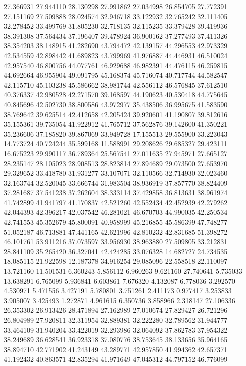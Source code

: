 27.366931
27.944110
28.130298
27.991862
27.034998
26.854705
27.772391
27.151169
27.509888
28.024574
32.946718
33.122932
32.765242
32.111405
32.278452
33.499769
31.805230
32.718135
32.115235
33.379428
39.419936
38.391308
37.564434
37.196407
39.478924
36.900162
37.277493
37.411326
38.354203
38.148915
41.282690
43.794472
42.139157
44.296553
42.973329
42.534559
42.898442
41.689823
43.799969
41.976887
44.446931
46.510024
42.957540
46.800756
44.077761
46.929688
46.982391
44.476115
46.259815
44.692664
46.955904
49.091795
45.168374
45.716074
40.717744
44.582547
42.115710
45.103238
45.586662
38.981744
42.556112
46.576845
37.612510
40.376337
42.980528
42.271570
39.168597
44.190623
40.530418
44.775645
40.845696
42.502730
38.800586
43.972977
35.438506
36.995675
41.583590
38.769642
39.625514
42.412658
42.205424
39.920601
41.190807
39.812616
35.155361
39.735054
41.922912
41.765712
37.562876
39.142600
41.350221
35.236606
37.185820
39.867069
33.949728
17.155513
29.555900
33.223043
14.773724
40.724244
35.599168
11.588991
29.208626
29.685327
29.423111
16.675223
29.990117
36.789364
25.567541
27.011635
27.945971
27.665127
28.235147
28.105023
28.908513
28.823814
27.894689
29.073500
27.653970
29.329652
33.418780
31.931277
33.107071
32.110566
32.714930
32.023460
32.163744
32.520045
33.666744
31.983504
38.936919
37.857770
38.824409
37.281687
37.541238
37.262604
38.333114
37.429858
36.813631
38.961974
41.742899
41.941797
41.170837
42.521260
42.552434
42.452939
42.279262
42.044393
42.396217
42.037542
46.281021
46.670703
44.990035
42.250534
42.741553
45.352679
45.800091
40.958999
45.216855
45.586399
47.748277
51.052187
46.713881
47.441165
42.621996
42.810232
42.831685
51.398272
46.101761
53.911216
37.073597
33.956930
38.963880
27.509805
33.212831
28.841109
35.265420
36.327041
42.424285
33.076328
14.682727
24.734535
18.085115
21.922598
12.187378
34.916254
29.085096
22.558518
22.110097
13.721160
11.501531
6.360243
5.856112
6.960263
9.621160
27.740641
5.735033
13.638291
6.765099
5.936841
6.603861
7.676320
4.132087
6.778036
3.292570
4.530971
5.471556
3.427191
5.780801
3.751261
2.411173
0.977417
3.253833
3.905007
3.425493
1.272871
4.961615
6.350736
3.858966
2.318147
27.106336
26.353302
26.913426
28.471894
27.162989
27.010674
27.829427
26.721296
26.804989
27.920811
32.311954
32.889381
32.222280
32.789562
31.944777
33.464109
31.940204
33.422019
32.293986
32.064092
37.862783
37.954322
38.249689
36.628541
36.923318
37.080776
38.753645
38.133656
35.964165
38.894710
42.771902
41.243149
43.289771
42.957850
41.994362
42.657371
41.192432
40.863571
42.835294
41.971649
47.045312
44.797152
46.776099
